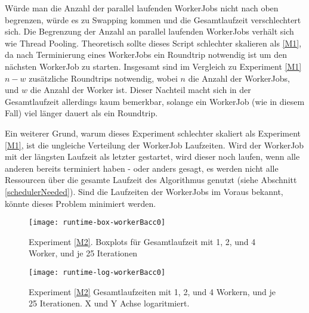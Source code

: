 Würde man die Anzahl der parallel laufenden WorkerJobs nicht  nach oben begrenzen, würde es zu Swapping kommen und die Gesamtlaufzeit verschlechtert sich.
Die Begrenzung der Anzahl an parallel laufenden WorkerJobs verhält sich wie Thread Pooling.
Theoretisch sollte dieses Script schlechter skalieren als \ref{M1}, da nach Terminierung eines WorkerJobs ein Roundtrip notwendig ist um den nächsten WorkerJob zu starten.
Insgesamt sind im Vergleich zu Experiment \ref{M1} $n - w$ zusätzliche Roundtrips notwendig, wobei $n$ die Anzahl der WorkerJobs, und $w$ die Anzahl der Worker ist.
Dieser Nachteil macht sich in der Gesamtlaufzeit allerdings kaum bemerkbar, solange ein WorkerJob (wie in diesem Fall) viel länger dauert als ein Roundtrip.

Ein weiterer Grund, warum dieses Experiment schlechter skaliert als Experiment \ref{M1}, ist die ungleiche Verteilung der WorkerJob Laufzeiten.
Wird der WorkerJob mit der längsten Laufzeit als letzter gestartet, wird dieser noch laufen, wenn alle anderen bereits terminiert haben
- oder anders gesagt, es werden nicht alle Ressourcen über die gesamte Laufzeit des Algorithmus genutzt (siehe Abschnitt \ref{schedulerNeeded}).
Sind die Laufzeiten der WorkerJobs im Voraus bekannt, könnte dieses Problem minimiert werden.


\vspace*{\fill}

\begin{figure}[H]
  \centering
  \begin{minipage}[b]{0.45\textwidth}
    \texttt{[image: runtime-box-workerBacc0]}
    \caption{Experiment \ref{M2}. Boxplots für Gesamtlaufzeit mit 1, 2, und 4 Worker, und je 25 Iterationen}
    \label{runtime-box-workerBacc0}
  \end{minipage}
  \hfill
  \begin{minipage}[b]{0.45\textwidth}
    \texttt{[image: runtime-log-workerBacc0]}
    \caption{Experiment \ref{M2} Gesamtlaufzeiten mit 1, 2, und 4 Workern, und je 25 Iterationen. X und Y Achse logaritmiert.}
    \label{runtime-log-workerBacc0}
  \end{minipage}
\end{figure}



















